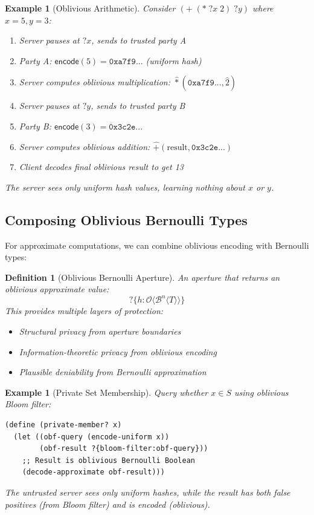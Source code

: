 \documentclass[12pt]{article}
\newtheorem{definition}[theorem]{Definition}
\newtheorem{example}[theorem]{Example}
\begin{document}
\begin{example}[Oblivious Arithmetic]
Consider $(+ \; (* \; ?x \; 2) \; ?y)$ where $x=5, y=3$:
\begin{enumerate}
    \item Server pauses at $?x$, sends to trusted party A
    \item Party A: $\mathsf{encode}(5) = \texttt{0xa7f9...}$ (uniform hash)
    \item Server computes oblivious multiplication: $\hat{*}(\texttt{0xa7f9...}, \hat{2})$
    \item Server pauses at $?y$, sends to trusted party B  
    \item Party B: $\mathsf{encode}(3) = \texttt{0x3c2e...}$
    \item Server computes oblivious addition: $\hat{+}(\text{result}, \texttt{0x3c2e...})$
    \item Client decodes final oblivious result to get 13
\end{enumerate}
The server sees only uniform hash values, learning nothing about $x$ or $y$.
\end{example}

\subsection{Composing Oblivious Bernoulli Types}

For approximate computations, we can combine oblivious encoding with Bernoulli types:

\begin{definition}[Oblivious Bernoulli Aperture]
An aperture that returns an oblivious approximate value:
$$?\{h : \mathcal{O}\langle\mathcal{B}^n\langle T \rangle\rangle\}$$
This provides multiple layers of protection:
\begin{itemize}
    \item Structural privacy from aperture boundaries
    \item Information-theoretic privacy from oblivious encoding
    \item Plausible deniability from Bernoulli approximation
\end{itemize}
\end{definition}

\begin{example}[Private Set Membership]
Query whether $x \in S$ using oblivious Bloom filter:
\begin{lstlisting}
(define (private-member? x)
  (let ((obf-query (encode-uniform x))
        (obf-result ?{bloom-filter:obf-query}))
    ;; Result is oblivious Bernoulli Boolean
    (decode-approximate obf-result)))
\end{lstlisting}
The untrusted server sees only uniform hashes, while the result has both false positives (from Bloom filter) and is encoded (oblivious).
\end{example}
\end{document}
